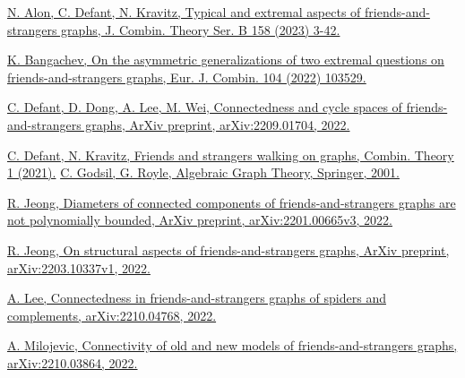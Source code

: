 \documentclass[11pt]{article}
\begin{document}
\begin{thebibliography}{99}
\small \setlength{\itemsep}{-.10mm}



 \href{https://www.sciencedirect.com/science/article/abs/pii/S0095895622000259?via%3Dihub} {N. Alon, C. Defant, N. Kravitz, Typical and extremal aspects of friends-and-strangers graphs, J. Combin. Theory Ser. B 158 (2023) 3-42.}




 \href{https://www.sciencedirect.com/science/article/abs/pii/S0195669822000257}{K. Bangachev, On the asymmetric generalizations of two extremal questions on friends-and-strangers graphs, Eur. J. Combin. 104 (2022) 103529.}
 

  \href{https://arxiv.org/pdf/2209.01704.pdf}{C. Defant, D. Dong, A. Lee, M. Wei, Connectedness and cycle spaces of friends-and-strangers graphs, ArXiv preprint, arXiv:2209.01704, 2022.}

  \href{http://refhub.elsevier.com/S0095-8956(22)00025-9/bib28F20A02BF8A021FAB4FCEC48AFB584Es1}{C. Defant, N. Kravitz, Friends and strangers walking on graphs, Combin. Theory 1 (2021).}
 \href{https://scholar.google.com/scholar?hl=zh-CN&as_sdt=0%2C5&q=C.+Godsil%2C+G.+Royle%2C+Algebraic+Graph+Theory&btnG=}{C. Godsil, G. Royle, Algebraic Graph Theory, Springer, 2001.} 


  \href{https://arxiv.org/abs/2201.00665}{R. Jeong, Diameters of connected components of friends-and-strangers graphs are not polynomially bounded, ArXiv preprint, arXiv:2201.00665v3, 2022.}

 \href{https://arxiv.org/abs/2203.10337}{ R. Jeong, On structural aspects of friends-and-strangers graphs, ArXiv preprint, arXiv:2203.10337v1, 2022.}


  \href{https://arxiv.org/abs/2210.04768}{A. Lee, Connectedness in friends-and-strangers graphs of spiders and complements, arXiv:2210.04768, 2022.}

  \href{https://arxiv.org/abs/2210.03864}{A. Milojevic, Connectivity of old and new models of friends-and-strangers graphs, arXiv:2210.03864, 2022.}





\end{thebibliography}
\end{document}
